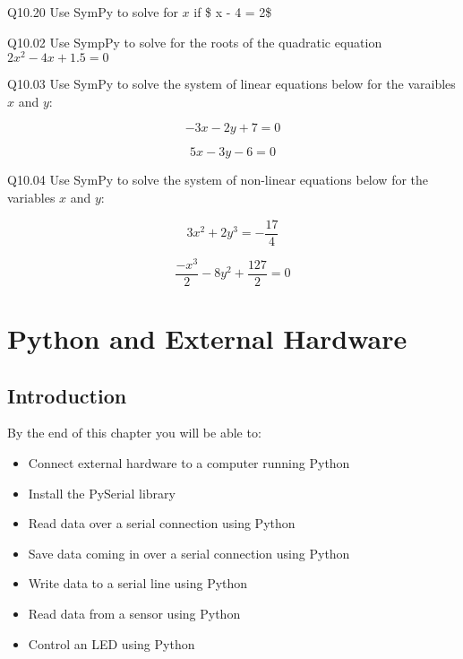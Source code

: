 \documentclass{book}
\newenvironment{problems}{}{}  %
\begin{document}
    
        \begin{problems}
        Q10.20 Use SymPy to solve for \(x\) if \$ x - 4 = 2\$

Q10.02 Use SympPy to solve for the roots of the quadratic equation
\(2x^2 - 4x + 1.5 = 0\)

Q10.03 Use SymPy to solve the system of linear equations below for the
varaibles \(x\) and \(y\):

\[ -3x - 2y + 7  = 0 \]

\[ 5x - 3y - 6 = 0 \]

Q10.04 Use SymPy to solve the system of non-linear equations below for
the variables \(x\) and \(y\):

\[ 3x^2 + 2y^3 = -\frac{17}{4} \]

\[ \frac{-x^3}{2} - 8y^2 + \frac{127}{2} = 0 \]
        \end{problems}

    




    
        \hypertarget{python-and-external-hardware}{%
\chapter{Python and External
Hardware}\label{python-and-external-hardware}}
    




    
        \hypertarget{introduction}{%
\section{Introduction}\label{introduction}}
    




    
        By the end of this chapter you will be able to:

\begin{itemize}
\item
  Connect external hardware to a computer running Python
\item
  Install the PySerial library
\item
  Read data over a serial connection using Python
\item
  Save data coming in over a serial connection using Python
\item
  Write data to a serial line using Python
\item
  Read data from a sensor using Python
\item
  Control an LED using Python
\end{itemize}
        \newpage
\end{document}
